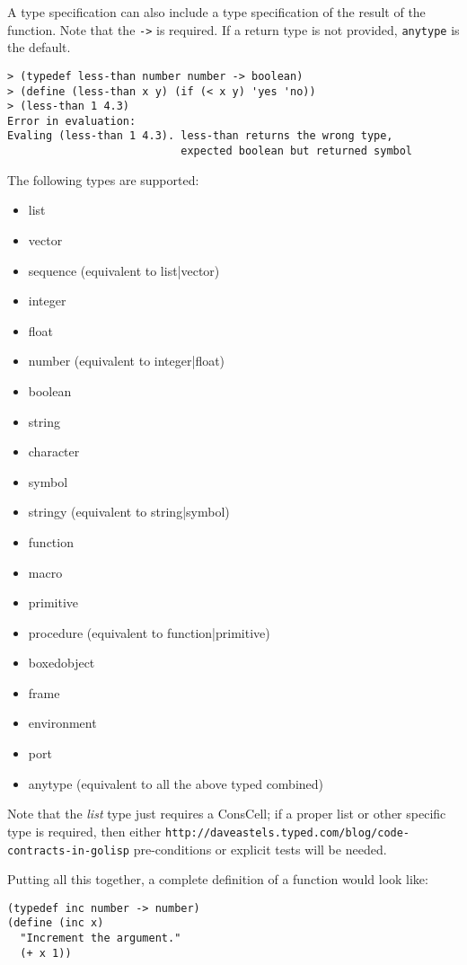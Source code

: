 \documentclass{article}
\begin{document}
A type specification can also include a type specification of the result of the function. Note
that the \verb|->| is required. If a return type is not provided, \verb|anytype| is the default.

\begin{verbatim}
> (typedef less-than number number -> boolean)
> (define (less-than x y) (if (< x y) 'yes 'no))
> (less-than 1 4.3)
Error in evaluation: 
Evaling (less-than 1 4.3). less-than returns the wrong type, 
                           expected boolean but returned symbol
\end{verbatim}

The following types are supported:

\begin{itemize}
\item list
\item vector
\item sequence (equivalent to list|vector)
\item integer
\item float
\item number (equivalent to integer|float)
\item boolean
\item string
\item character
\item symbol
\item stringy (equivalent to string|symbol)
\item function
\item macro
\item primitive
\item procedure (equivalent to function|primitive)
\item boxedobject
\item frame
\item environment
\item port
\item anytype (equivalent to all the above typed combined)
\end{itemize}

Note that the \emph{list} type just requires a ConsCell; if a proper list or other specific
type is required, then either \verb|http://daveastels.typed.com/blog/code-contracts-in-golisp|
pre-conditions or explicit tests will be needed.

Putting all this together, a complete definition of a function would look like:

\begin{verbatim}
(typedef inc number -> number)
(define (inc x) 
  "Increment the argument." 
  (+ x 1))
\end{verbatim}
\end{document}
